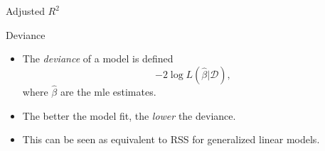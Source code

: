 \documentclass[
  10pt,
  ignorenonframetext,
]{beamer}
\newenvironment{Shaded}{\begin{snugshade}}{\end{snugshade}}
\newcommand{\CommentTok}[1]{\textcolor[rgb]{0.56,0.35,0.01}{\textit{#1}}}
\newcommand{\DecValTok}[1]{\textcolor[rgb]{0.00,0.00,0.81}{#1}}
\newcommand{\FunctionTok}[1]{\textcolor[rgb]{0.00,0.00,0.00}{#1}}
\newcommand{\NormalTok}[1]{#1}
\newcommand{\OtherTok}[1]{\textcolor[rgb]{0.56,0.35,0.01}{#1}}
\newcommand{\SpecialCharTok}[1]{\textcolor[rgb]{0.00,0.00,0.00}{#1}}
\newcommand*{\given}{\vert}
\begin{document}
\begin{frame}[fragile]{Adjusted \(R^2\)}
\protect\hypertarget{adjusted-r2-1}{}
\begin{Shaded}
\end{Shaded}
\end{frame}

\begin{frame}{Deviance}
\protect\hypertarget{deviance}{}
\begin{itemize}
\item
  The \emph{deviance} of a model is defined
  \[-2 \log  L(\hat{\beta}\given\mathcal{D}) ,\] where \(\hat{\beta}\)
  are the mle estimates.
\item
  The better the model fit, the \emph{lower} the deviance.
\item
  This can be seen as equivalent to RSS for generalized linear models.
\end{itemize}
\end{frame}
\end{document}

